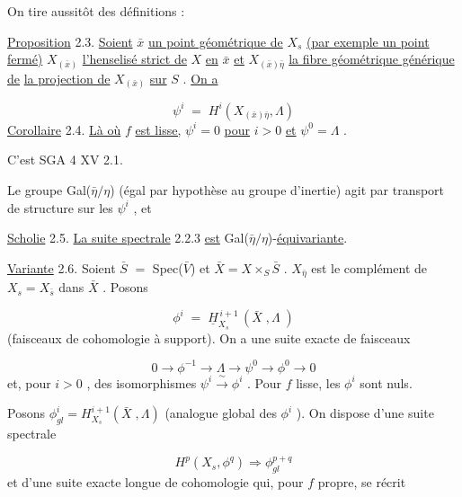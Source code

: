 
On tire aussitôt des définitions :

\underline{Proposition} 2.3.  \underline{Soient}  $\bar{x}$  \underline{un point géométrique de}  $X_s$  \underline{(par exemple un point fermé)} $X_{(\bar{x})}$  \underline{l'henselisé strict de}  $X$  \underline{en}  $\bar{x}$  \underline{et}  $X_{(\bar{x})\bar{\eta}}$   \underline{la fibre géométrique générique de} \underline{la projection de}  $X_{(\bar{x})}$  \underline{sur}  $S$ .  \underline{On a}

\begin{equation*}
\psi^i \;=\; H^i(X_{(\bar{x})\bar{\eta}},\Lambda)
\end{equation*}
\underline{Corollaire} 2.4.  \underline{Là où}  $f$  \underline{est lisse,}  $\psi^i = 0$  \underline{pour}  $i > 0$  \underline{et}  $\psi^{0} = \Lambda$ .

C'est SGA 4 XV 2.1.

Le groupe  Gal($\bar{\eta}/\eta$)  (égal par hypothèse au groupe d'inertie) agit par transport de structure sur les   $\psi^i$ , et

\underline{Scholie} 2.5.  \underline{La suite spectrale} 2.2.3 \underline{est}  Gal($\bar{\eta}/\eta$)-\underline{équivariante}.

\underline{Variante} 2.6.  Soient  $\bar{S}$ $=$ Spec($\bar{V}$)  et  $\bar{X} = X \times_S \bar{S}$ .  $X_{\bar{\eta}}$  est le complément de $X_s = X_{\bar{s}}$  dans  $\bar{X}$ . Posons

\begin{equation*}
\phi^i \;=\; \underline{H}^{\,i+1}_{X_s}\,(\bar{X}\;,\Lambda\;)
\end{equation*}
(faisceaux de cohomologie à support). On a une suite exacte de faisceaux

\begin{equation*}
0 \longrightarrow \phi^{-1} \longrightarrow \Lambda \longrightarrow \psi^{0} \longrightarrow \phi^{0} \longrightarrow 0
\end{equation*}
et, pour  $i > 0$ , des isomorphismes  $\psi^i \xrightarrow{\ \sim\ } \phi^i$ . Pour  $f$  lisse, les  $\phi^i$  sont nuls.

Posons  $\phi^i_{gl} = H^{i+1}_{X_s}(\bar{X}\;,\Lambda)$  (analogue global des  $\phi^i$ ). On dispose d'une suite spectrale

\begin{equation*}\tag{2.6.1}
H^p(X_s,\phi^q) \Longrightarrow \phi^{p+q}_{gl}
\end{equation*}
et d'une suite exacte longue de cohomologie qui, pour  $f$  propre, se récrit

